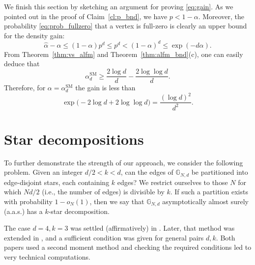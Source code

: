 \documentclass[12pt]{amsart}
\theoremstyle{definition}
\newcommand\Gb{\mathbb{G}}
\newcommand\al{\alpha}
\newcommand\alsm{\alpha^{\mathrm{SM}}}
\begin{document}
We finish this section by sketching an argument for proving \eqref{eq:gain}. As we pointed out in the proof of Claim~\ref{cl:p_bnd}, we have $p < 1-\al$. Moreover, the probability \eqref{eq:prob_fullzero} that a vertex is full-zero is clearly an upper bound for the density gain:
%
\[ \hat{\al}-\al \leq (1-\al)p^d \leq p^d 
< (1-\al)^d \leq \exp(-d\al) .\]
%
From Theorem~\ref{thm:vs_alfm} and Theorem~\ref{thm:alfm_bnd}(c), one can easily deduce that 
%
\[ \alsm_d \geq \frac{2 \log d}{d} - \frac{2 \log\log d}{d} .\]
%
Therefore, for $\al=\alsm_d$ the gain is less than  
%
\[ \exp\big( -2 \log d + 2 \log\log d \big) 
= \frac{(\log d)^2}{d^2} .\]
%


\section{Star decompositions} \label{sec:star_decomp}

To further demonstrate the strength of our approach, we consider the following problem. Given an integer $d/2 < k < d$, can the edges of $\Gb_{N,d}$ be partitioned into edge-disjoint stars, each containing $k$ edges? We restrict ourselves to those $N$ for which $Nd/2$ (i.e., the number of edges) is divisible by $k$. If such a partition exists with probability $1-o_N(1)$, then we say that $\Gb_{N,d}$ asymptotically almost surely (a.a.s.) has a $k$-star decomposition.


The case $d=4, k=3$ was settled (affirmatively) in \cite{delcourt2018random}. Later, that method was extended in \cite{delcourt2025decomposing}, and a sufficient condition was given for general pairs $d,k$. Both papers used a second moment method and checking the required conditions led to very technical computations.
\end{document}
